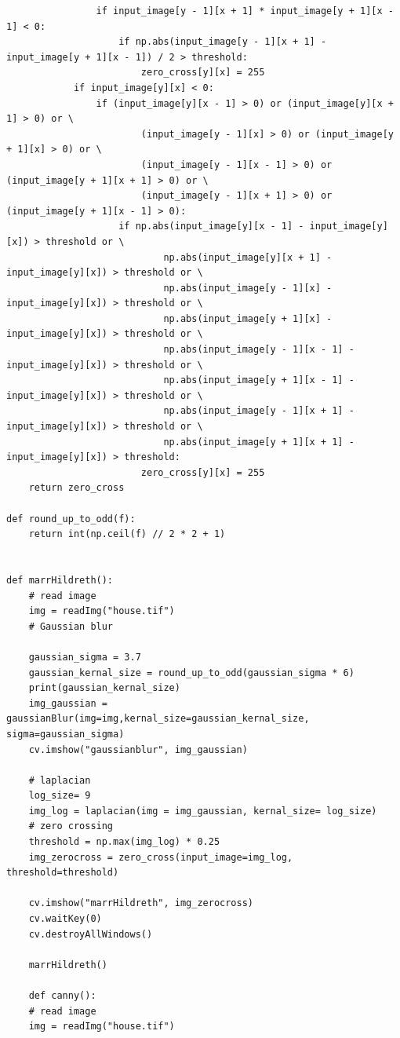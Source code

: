 \documentclass[12pt]{article}
\begin{document}
\begin{enumerate}[leftmargin=\labelsep]
\begin{enumerate}
\begin{lstlisting}
                if input_image[y - 1][x + 1] * input_image[y + 1][x - 1] < 0:
                    if np.abs(input_image[y - 1][x + 1] - input_image[y + 1][x - 1]) / 2 > threshold:
                        zero_cross[y][x] = 255
            if input_image[y][x] < 0:
                if (input_image[y][x - 1] > 0) or (input_image[y][x + 1] > 0) or \
                        (input_image[y - 1][x] > 0) or (input_image[y + 1][x] > 0) or \
                        (input_image[y - 1][x - 1] > 0) or (input_image[y + 1][x + 1] > 0) or \
                        (input_image[y - 1][x + 1] > 0) or (input_image[y + 1][x - 1] > 0):
                    if np.abs(input_image[y][x - 1] - input_image[y][x]) > threshold or \
                            np.abs(input_image[y][x + 1] - input_image[y][x]) > threshold or \
                            np.abs(input_image[y - 1][x] - input_image[y][x]) > threshold or \
                            np.abs(input_image[y + 1][x] - input_image[y][x]) > threshold or \
                            np.abs(input_image[y - 1][x - 1] - input_image[y][x]) > threshold or \
                            np.abs(input_image[y + 1][x - 1] - input_image[y][x]) > threshold or \
                            np.abs(input_image[y - 1][x + 1] - input_image[y][x]) > threshold or \
                            np.abs(input_image[y + 1][x + 1] - input_image[y][x]) > threshold:
                        zero_cross[y][x] = 255
    return zero_cross

def round_up_to_odd(f):
    return int(np.ceil(f) // 2 * 2 + 1)


def marrHildreth():
    # read image
    img = readImg("house.tif")
    # Gaussian blur

    gaussian_sigma = 3.7
    gaussian_kernal_size = round_up_to_odd(gaussian_sigma * 6)
    print(gaussian_kernal_size)
    img_gaussian = gaussianBlur(img=img,kernal_size=gaussian_kernal_size, sigma=gaussian_sigma)
    cv.imshow("gaussianblur", img_gaussian)

    # laplacian
    log_size= 9
    img_log = laplacian(img = img_gaussian, kernal_size= log_size)
    # zero crossing
    threshold = np.max(img_log) * 0.25
    img_zerocross = zero_cross(input_image=img_log, threshold=threshold)

    cv.imshow("marrHildreth", img_zerocross)
    cv.waitKey(0)
    cv.destroyAllWindows()

    marrHildreth()

    def canny():
    # read image
    img = readImg("house.tif")


\end{lstlisting}
\end{enumerate}
\end{enumerate}
\end{document}
